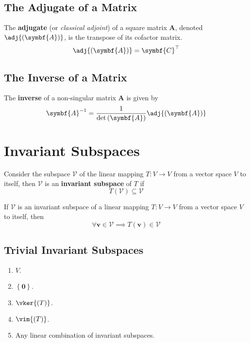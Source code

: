\documentclass{article}
\begin{document}
\subsection{The Adjugate of a Matrix}
\begin{definition}
    The \textbf{adjugate} (or \textit{classical adjoint}) of a square
    matrix \(\symbf{A}\), denoted
    \(\adj{\left( \symbf{A} \right)}\), is the transpose of its cofactor
    matrix.
    \begin{equation*}
        \adj{\left( \symbf{A} \right)} = \symbf{C}^\top
    \end{equation*}
\end{definition}
\subsection{The Inverse of a Matrix}
\begin{theorem}
    The \textbf{inverse} of a non-singular matrix \(\symbf{A}\) is
    given by
    \begin{equation*}
        \symbf{A}^{-1}=\frac{1}{\det{\left( \symbf{A} \right)}} \adj{\left( \symbf{A} \right)}
    \end{equation*}
\end{theorem}
\section{Invariant Subspaces}
\begin{definition}
    Consider the subspace \(\mathcal{V}\) of the linear mapping
    \(T:V\rightarrow V\) from a vector space \(V\) to itself, then
    \(\mathcal{V}\) is an \textbf{invariant subspace} of \(T\) if
    \begin{equation*}
        T\left(\mathcal{V}\right)\subseteq \mathcal{V}
    \end{equation*}
\end{definition}
\begin{theorem}
    If \(\mathcal{V}\) is an invariant subspace of a linear mapping
    \(T: V \rightarrow V\) from a vector space \(V\) to itself, then
    \begin{equation*}
        \forall \symbf{v}\in \mathcal{V}\implies T\left(\symbf{v}\right)\in \mathcal{V}
    \end{equation*}
\end{theorem}
\subsection{Trivial Invariant Subspaces}
\begin{enumerate}
    \item \(V\).
    \item \(\left\{ \symbf{0} \right\}\).
    \item \(\vker{\left( T \right)}\).
    \item \(\vim{\left( T \right)}\).
    \item Any linear combination of invariant subspaces.
\end{enumerate}
\end{document}
